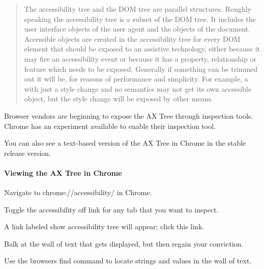 \begin{quote}
The accessibility tree and the D\+OM tree are parallel structures. Roughly speaking the accessibility tree is a subset of the D\+OM tree. It includes the user interface objects of the user agent and the objects of the document. Accessible objects are created in the accessibility tree for every D\+OM element that should be exposed to an assistive technology, either because it may fire an accessibility event or because it has a property, relationship or feature which needs to be exposed. Generally if something can be trimmed out it will be, for reasons of performance and simplicity. For example, a  with just a style change and no semantics may not get its own accessible object, but the style change will be exposed by other means. \end{quote}


Browser vendors are beginning to expose the AX Tree through inspection tools. Chrome has an experiment available to enable their inspection tool.

You can also see a text-\/based version of the AX Tree in Chrome in the stable release version.

\paragraph*{Viewing the AX Tree in Chrome}


\begin{DoxyEnumerate}
\item Navigate to {\ttfamily chrome\+://accessibility/} in Chrome.
\end{DoxyEnumerate}
\begin{DoxyEnumerate}
\item Toggle the {\ttfamily accessibility off} link for any tab that you want to inspect.
\end{DoxyEnumerate}
\begin{DoxyEnumerate}
\item A link labeled {\ttfamily show accessibility tree} will appear; click this link.
\end{DoxyEnumerate}
\begin{DoxyEnumerate}
\item Balk at the wall of text that gets displayed, but then regain your conviction.
\end{DoxyEnumerate}
\begin{DoxyEnumerate}
\item Use the browser\textquotesingle{}s find command to locate strings and values in the wall of text.
\end{DoxyEnumerate}

